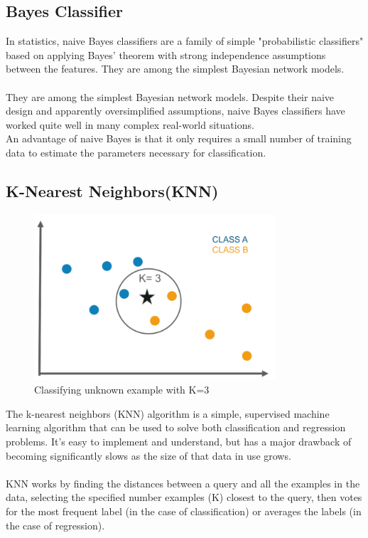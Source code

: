 \subsection*{Bayes Classifier}
In statistics, naive Bayes classifiers are a family of simple "probabilistic classifiers" based on applying Bayes' theorem with strong independence assumptions between the features. They are among the simplest Bayesian network models.\\
\\
They are among the simplest Bayesian network models. Despite their naive design and apparently oversimplified assumptions, naive Bayes classifiers have worked quite well in many complex real-world situations.\\
An advantage of naive Bayes is that it only requires a small number of training data to estimate the parameters necessary for classification.


\subsection*{K{-}Nearest Neighbors(KNN)}
\begin{figure}[!ht]
	\centering
	\includegraphics[width=0.8\textwidth]{images/knn.png}
	\caption{Classifying unknown example with K=3}
	\centering
	\label{label:knn}
\end{figure}
The k-nearest neighbors (KNN) algorithm is a simple, supervised machine learning algorithm that can be used to solve both classification and regression problems. It’s easy to implement and understand, but has a major drawback of becoming significantly slows as the size of that data in use grows.\\
\\
KNN works by finding the distances between a query and all the examples in the data, selecting the specified number examples (K) closest to the query, then votes for the most frequent label (in the case of classification) or averages the labels (in the case of regression).


